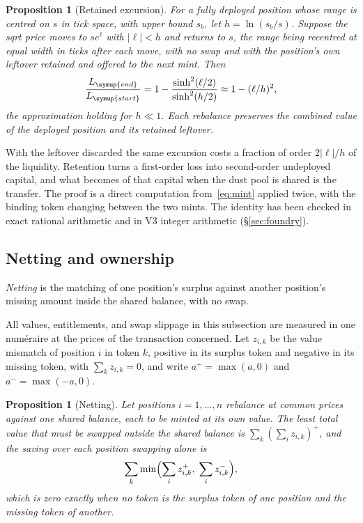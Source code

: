 \documentclass[11pt,a4paper]{article}
\theoremstyle{siphon}
\newtheorem{proposition}[theorem]{Proposition}
\begin{document}
\begin{proposition}[Retained excursion]\label{prop:excursion}
For a fully deployed position whose range is centred on $s$ in tick space, with upper bound $s_b$, let $h = \ln(s_b/s)$. Suppose the sqrt price moves to $s e^{\ell}$ with $|\ell| < h$ and returns to $s$, the range being recentred at equal width in ticks after each move, with no swap and with the position's own leftover retained and offered to the next mint. Then
\[
\frac{L_{\symup{end}}}{L_{\symup{start}}}
= 1 - \frac{\sinh^2(\ell/2)}{\sinh^2(h/2)}
\approx 1 - (\ell/h)^{2},
\]
the approximation holding for $h \ll 1$. Each rebalance preserves the combined value of the deployed position and its retained leftover.
\end{proposition}

\noindent With the leftover discarded the same excursion costs a fraction of order $2|\ell|/h$ of the liquidity. Retention turns a first-order loss into second-order undeployed capital, and what becomes of that capital when the dust pool is shared is the transfer. The proof is a direct computation from~\eqref{eq:mint} applied twice, with the binding token changing between the two mints. The identity has been checked in exact rational arithmetic and in V3 integer arithmetic (\S\ref{sec:foundry}).

\subsection{Netting and ownership}\label{sec:ownership}

\emph{Netting} is the matching of one position's surplus against another position's missing amount inside the shared balance, with no swap.

All values, entitlements, and swap slippage in this subsection are measured in one num\'eraire at the prices of the transaction concerned. Let $z_{i,k}$ be the value mismatch of position $i$ in token $k$, positive in its surplus token and negative in its missing token, with $\sum_k z_{i,k} = 0$, and write $a^{+} = \max(a, 0)$ and $a^{-} = \max(-a, 0)$.

\begin{proposition}[Netting]\label{prop:netting}
Let positions $i = 1, \ldots, n$ rebalance at common prices against one shared balance, each to be minted at its own value. The least total value that must be swapped outside the shared balance is $\sum_k (\sum_i z_{i,k})^{+}$, and the saving over each position swapping alone is
\[
\sum_k \min\Bigl(\sum_i z_{i,k}^{+},\; \sum_i z_{i,k}^{-}\Bigr),
\]
which is zero exactly when no token is the surplus token of one position and the missing token of another.
\end{proposition}
\end{document}
